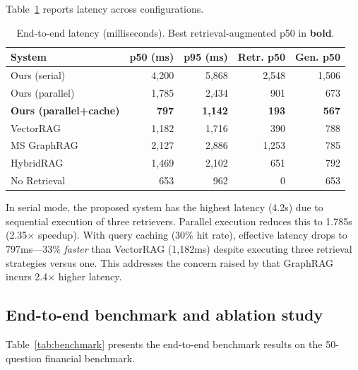 \documentclass[review]{elsarticle}
\begin{document}
Table~\ref{tab:latency} reports latency across configurations.

\begin{table}[t]
\caption{End-to-end latency (milliseconds). Best retrieval-augmented p50 in \textbf{bold}.}
\label{tab:latency}
\centering
\small
\begin{tabular}{@{}lrrrr@{}}
\toprule
\textbf{System} & \textbf{p50 (ms)} & \textbf{p95 (ms)} & \textbf{Retr. p50} & \textbf{Gen. p50} \\
\midrule
Ours (serial) & 4,200 & 5,868 & 2,548 & 1,506 \\
Ours (parallel) & 1,785 & 2,434 & 901 & 673 \\
\textbf{Ours (parallel+cache)} & \textbf{797} & \textbf{1,142} & \textbf{193} & \textbf{567} \\
VectorRAG & 1,182 & 1,716 & 390 & 788 \\
MS GraphRAG & 2,127 & 2,886 & 1,253 & 785 \\
HybridRAG & 1,469 & 2,102 & 651 & 792 \\
No Retrieval & 653 & 962 & 0 & 653 \\
\bottomrule
\end{tabular}
\end{table}

In serial mode, the proposed system has the highest latency (4.2s) due to sequential execution of three retrievers. Parallel execution reduces this to 1.785s (2.35$\times$ speedup). With query caching (30\% hit rate), effective latency drops to 797ms---33\% \emph{faster} than VectorRAG (1,182ms) despite executing three retrieval strategies versus one. This addresses the concern raised by \citet{benchmarkretrieval2025} that GraphRAG incurs 2.4$\times$ higher latency.


\subsection{End-to-end benchmark and ablation study}
\label{sec:res-benchmark}

Table~\ref{tab:benchmark} presents the end-to-end benchmark results on the 50-question financial benchmark.
\end{document}
